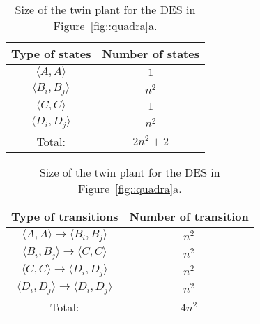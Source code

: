 \documentclass{article}
\begin{document}
\begin{table}[t!]
  \begin{minipage}{.5\linewidth}
    \begin{center}
      \begin{tabular}{c | c}
        Type of states & Number of states\\ 
        \hline 
        $\langle A, A\rangle$ & $1$\\
        $\langle B_i, B_j\rangle$ & $n^2$\\
        $\langle C, C\rangle$ & $1$\\
        $\langle D_i, D_j\rangle$ & $n^2$\\
        \hline
        Total: & $2n^2 + 2$
      \end{tabular}
    \end{center}
  \end{minipage}\begin{minipage}{.5\linewidth}
    \begin{center}
      \begin{tabular}{c | c}
        Type of transitions & Number of transition\\ 
        \hline 
        $\langle A, A\rangle \rightarrow \langle B_i, B_j\rangle$ & $n^2$\\
        $\langle B_i, B_j\rangle \rightarrow \langle C, C\rangle$ & $n^2$\\
        $\langle C, C\rangle \rightarrow \langle D_i, D_j\rangle$ & $n^2$\\
        $\langle D_i, D_j\rangle \rightarrow \langle D_i, D_j\rangle$ 
        & $n^2$\\
        \hline
        Total: & $4 n^2$
      \end{tabular}
    \end{center}
  \end{minipage}
  \caption{Size of the twin plant for the DES in Figure~\ref{fig::quadra}a.}
  \label{tab::tpsize}
\end{table}
\end{document}
